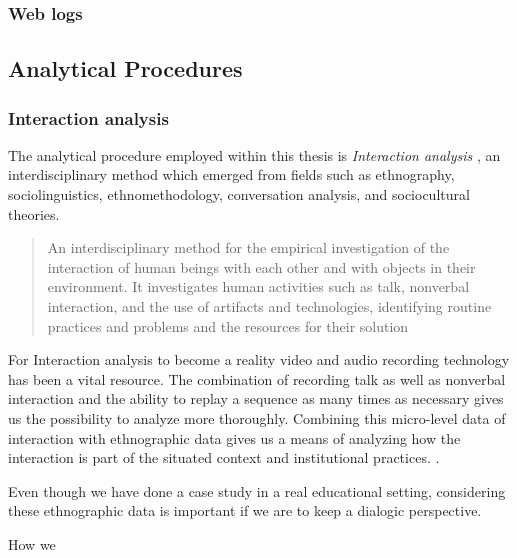 \subsubsection{Web logs}





\subsection{Analytical Procedures}
\subsubsection{Interaction analysis}
The analytical procedure employed within this thesis is \emph{Interaction analysis} \citep{jordan1995interaction}, an interdisciplinary method which emerged from fields such as ethnography, sociolinguistics, ethnomethodology, conversation analysis, and sociocultural theories. 

\begin{quote}
An interdisciplinary method for the empirical investigation of the interaction of human
beings with each other and with objects in their environment. It investigates human
activities such as talk, nonverbal interaction, and the use of artifacts and technologies,
identifying routine practices and problems and the resources for their solution \citep[p39]{jordan1995interaction}
\end{quote}

For Interaction analysis to become a reality video and audio recording technology has been a vital resource. The combination of recording talk as well as nonverbal interaction and the ability to replay a sequence as many times as necessary gives us the possibility to analyze more thoroughly. Combining this micro-level data of interaction with ethnographic data gives us a means of analyzing how the interaction is part of the situated context and institutional practices. \citep{furberg2009scientific}. 

Even though we have done a case study in a real educational setting, considering these ethnographic data is important if we are to keep a dialogic perspective. 

How we 


